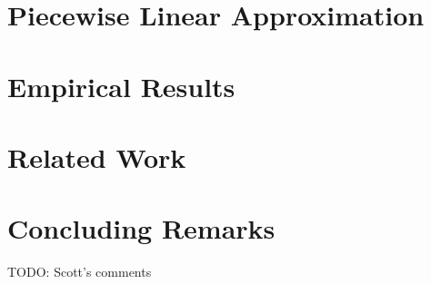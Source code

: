 \documentclass{article}
\begin{document}


\section{Piecewise Linear Approximation}



\section{Empirical Results}



\section{Related Work}



\section{Concluding Remarks}



TODO: Scott's comments




\end{document}
